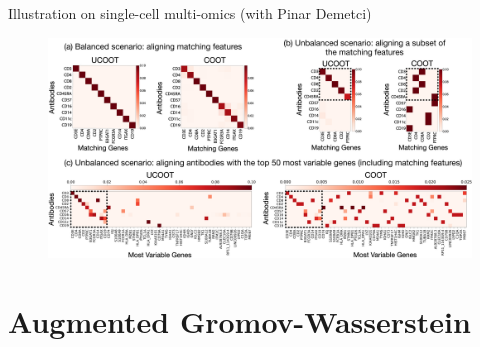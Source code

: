 \documentclass{beamer}
\begin{document}
\begin{frame}{Illustration on single-cell multi-omics (with Pinar Demetci)}
\scriptsize
\begin{figure}
      \centering
      \includegraphics[width=1.05\linewidth, keepaspectratio=true]{OT_new/genes-alignments.pdf}
  \end{figure}
\end{frame}

\section{Augmented Gromov-Wasserstein}
\end{document}
